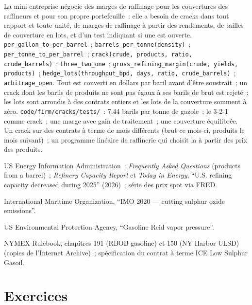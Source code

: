 \begin{build}
 La mini-entreprise négocie des marges de raffinage pour les couvertures des raffineurs et
pour son propre portefeuille~: elle a besoin de cracks dans tout rapport et toute unité, de marges de raffinage à partir des rendements,
de tailles de couverture en lots, et d'un test indiquant si une  est ouverte.
 \texttt{per\_gallon\_to\_per\_barrel}~; \texttt{barrels\_per\_tonne(density)}~;
\texttt{per\_tonne\_to\_per\_barrel}~; \texttt{crack(crude, products, ratio, crude\_barrels)}~;
\texttt{three\_two\_one}~; \texttt{gross\_refining\_margin(crude, yields, products)}~;
\texttt{hedge\_lots(throughput\_bpd, days, ratio, crude\_barrels)}~;
\texttt{arbitrage\_open}.
 Tout est converti en dollars par baril avant d'être soustrait~; un
crack dont les barils de produits ne sont pas égaux à ses barils de brut est rejeté~; les lots sont
arrondis à des contrats entiers et les lots de la couverture somment à zéro.
 \texttt{code/firm/cracks/tests/}~: 7.44 barils par tonne de
gazole~; le 3-2-1 comme crack~; une marge avec gain de traitement~; une couverture équilibrée.
 Un crack sur des contrats à terme de mois différents (brut ce mois-ci, produits
le mois suivant)~; un programme linéaire de raffinerie qui choisit la  à partir des prix des produits.
\end{build}

\begin{omsources}
\item US Energy Information Administration~: \emph{Frequently Asked Questions} (products
from a barrel)~; \emph{Refinery Capacity Report} et \emph{Today in Energy}, ``U.S.
refining capacity decreased during 2025'' (2026)~; série des prix spot via FRED.
\item International Maritime Organization, ``IMO 2020 --- cutting sulphur oxide emissions''.
\item US Environmental Protection Agency, ``Gasoline Reid vapor pressure''.
\item NYMEX Rulebook, chapitres 191 (RBOB gasoline) et 150 (NY Harbor ULSD) (copies de l'Internet Archive)~; spécification du contrat à terme
ICE Low Sulphur Gasoil.
\end{omsources}

\section{Exercices}

